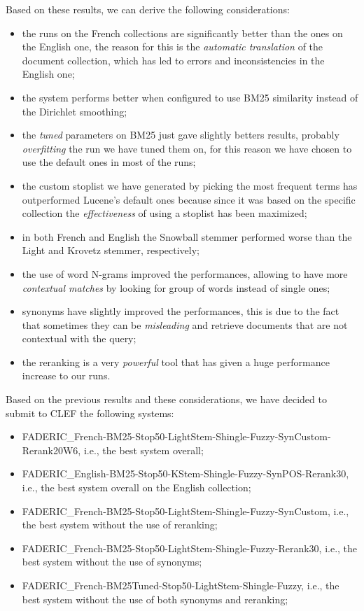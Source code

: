\pagebreak

Based on these results, we can derive the following considerations:

\begin{itemize}
	\item the runs on the French collections are significantly better than the ones on the English one, the reason for this is the \emph{automatic translation} of the document collection, which has led to errors and inconsistencies in the English one;
	\item the system performs better when configured to use BM25 similarity instead of the Dirichlet smoothing;
	\item the \emph{tuned} parameters on BM25 just gave slightly betters results, probably \emph{overfitting} the run we have tuned them on, for this reason we have chosen to use the default ones in most of the runs;
	\item the custom stoplist we have generated by picking the most frequent terms has outperformed Lucene's default ones because since it was based on the specific collection the \emph{effectiveness} of using a stoplist has been maximized;
	\item in both French and English the Snowball stemmer performed worse than the Light and Krovetz stemmer, respectively;
	\item the use of word N-grams improved the performances, allowing to have more \emph{contextual matches} by looking for group of words instead of single ones;
	\item synonyms have slightly improved the performances, this is due to the fact that sometimes they can be \emph{misleading} and retrieve documents that are not contextual with the query;
	\item the reranking is a very \emph{powerful} tool that has given a huge performance increase to our runs.
\end{itemize}

Based on the previous results and these considerations, we have decided to submit to \ac{CLEF} the following systems:
\begin{itemize}
	\item FADERIC\_French-BM25-Stop50-LightStem-Shingle-Fuzzy-SynCustom-Rerank20W6, i.e., the best system overall;
	\item FADERIC\_English-BM25-Stop50-KStem-Shingle-Fuzzy-SynPOS-Rerank30, i.e., the best system overall on the English collection;
	\item FADERIC\_French-BM25-Stop50-LightStem-Shingle-Fuzzy-SynCustom, i.e., the best system without the use of reranking;
	\item FADERIC\_French-BM25-Stop50-LightStem-Shingle-Fuzzy-Rerank30, i.e., the best system without the use of synonyms;
	\item FADERIC\_French-BM25Tuned-Stop50-LightStem-Shingle-Fuzzy, i.e., the best system without the use of both synonyms and reranking;

\end{itemize}
